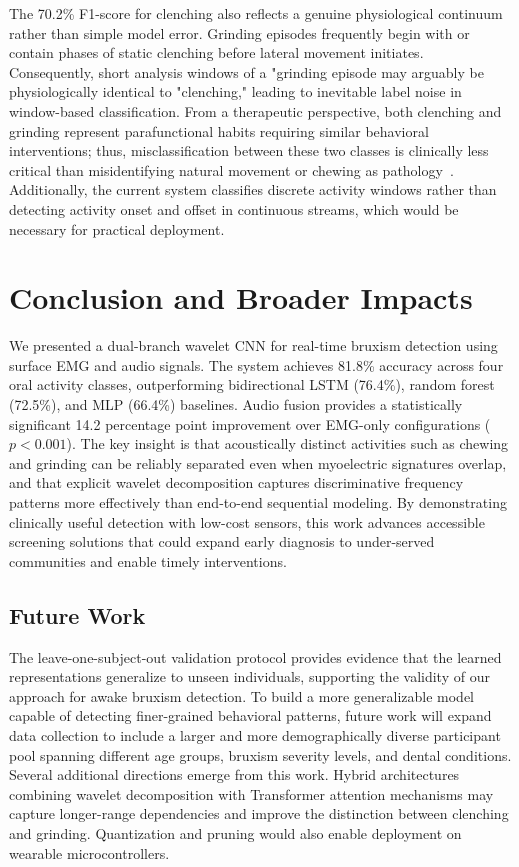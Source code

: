 \documentclass[acmtog, nonacm]{acmart}
\begin{document}
The 70.2\% F1-score for clenching also reflects a genuine physiological continuum rather than simple model error. Grinding episodes frequently begin with or contain phases of static clenching before lateral movement initiates. Consequently, short analysis windows of a "grinding episode may arguably be physiologically identical to "clenching," leading to inevitable label noise in window-based classification. From a therapeutic perspective, both clenching and grinding represent parafunctional habits requiring similar behavioral interventions; thus, misclassification between these two classes is clinically less critical than misidentifying natural movement or chewing as pathology~\cite{lobbezoo2018international}. Additionally, the current system classifies discrete activity windows rather than detecting activity onset and offset in continuous streams, which would be necessary for practical deployment.

\section{Conclusion and Broader Impacts}


We presented a dual-branch wavelet CNN for real-time bruxism detection using surface EMG and audio signals. The system achieves 81.8\% accuracy across four oral activity classes, outperforming bidirectional LSTM (76.4\%), random forest (72.5\%), and MLP (66.4\%) baselines. Audio fusion provides a statistically significant 14.2 percentage point improvement over EMG-only configurations ($p < 0.001$). The key insight is that acoustically distinct activities such as chewing and grinding can be reliably separated even when myoelectric signatures overlap, and that explicit wavelet decomposition captures discriminative frequency patterns more effectively than end-to-end sequential modeling. By demonstrating clinically useful detection with low-cost sensors, this work advances accessible screening solutions that could expand early diagnosis to under-served communities and enable timely interventions.


\subsection{Future Work}

The leave-one-subject-out validation protocol provides evidence that the learned representations generalize to unseen individuals, supporting the validity of our approach for awake bruxism detection. To build a more generalizable model capable of detecting finer-grained behavioral patterns, future work will expand data collection to include a larger and more demographically diverse participant pool spanning different age groups, bruxism severity levels, and dental conditions. Several additional directions emerge from this work. Hybrid architectures combining wavelet decomposition with Transformer attention mechanisms may capture longer-range dependencies and improve the distinction between clenching and grinding. Quantization and pruning would also enable deployment on wearable microcontrollers.
\end{document}
